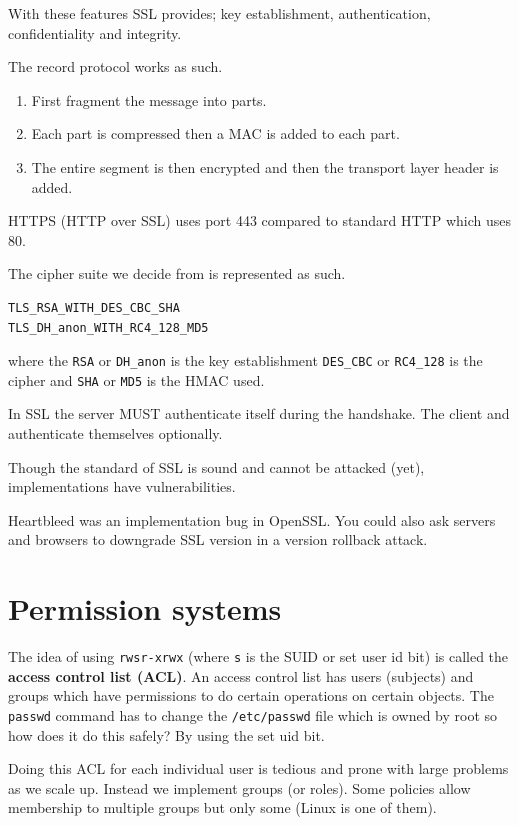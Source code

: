 \documentclass{report}
\begin{document}
With these features SSL provides; key establishment, authentication,
confidentiality and integrity.

The record protocol works as such.
\begin{enumerate}
    \item First fragment the message into parts.
    \item Each part is compressed then a MAC is added to each part.
    \item The entire segment is then encrypted and then the transport
        layer header is added.
\end{enumerate}

HTTPS (HTTP over SSL) uses port 443 compared to standard HTTP which uses 80.

The cipher suite we decide from is represented as such.
\begin{verbatim}
TLS_RSA_WITH_DES_CBC_SHA
TLS_DH_anon_WITH_RC4_128_MD5
\end{verbatim}

where the \texttt{RSA} or \texttt{DH\_anon} is the key establishment
\texttt{DES\_CBC} or \texttt{RC4\_128} is the cipher and
\texttt{SHA} or \texttt{MD5} is the HMAC used.

In SSL the server MUST authenticate itself during the handshake. The client and
authenticate themselves optionally.

Though the standard of SSL is sound and cannot be attacked (yet),
implementations have vulnerabilities.

Heartbleed was an implementation bug in OpenSSL\@.
You could also ask servers and browsers to downgrade SSL version in a
version rollback attack.

\section{Permission systems}
The idea of using \texttt{rwsr-xrwx} (where \texttt{s} is the SUID or set user
id bit) is called the \textbf{access control list (ACL)}.
An access control list has users
(subjects) and groups which have permissions to do certain operations
on certain objects. The \texttt{passwd} command has to change the
\texttt{/etc/passwd} file which is owned by root so how does it do this safely?
By using the set uid bit.

Doing this ACL for each individual user is tedious and prone with large problems
as we scale up. Instead we implement groups (or roles). Some policies allow
membership to multiple groups but only some (Linux is one of them).
\end{document}
